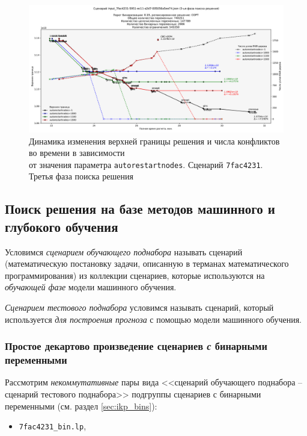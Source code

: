 \documentclass[%
	11pt,
	a4paper,
	utf8,
		]{article}
\begin{document}
{%
\begin{figure}[!h]
	\centering
	\includegraphics[scale=0.42]{figures/7fac4231_autorestartnodes.pdf}
	\caption{ Динамика изменения верхней границы решения и числа конфликтов во времени в зависимости \\от значения параметра \texttt{autorestartnodes}. Сценарий \texttt{7fac4231}. Третья фаза поиска решения}\label{fig:7fac4231_autorestartnodes}
\end{figure}

\subsection{Поиск решения на базе методов машинного и глубокого обучения}

Условимся \emph{сценарием обучающего поднабора} называть сценарий (математическую постановку задачи, описанную в терманах математического программирования) из коллекции сценариев, которые используются на \emph{обучающей фазе} модели машинного обучения.

\emph{Сценарием тестового поднабора} условимся называть сценарий, который используется \emph{для построения прогноза} с помощью модели машинного обучения.

\subsubsection{Простое декартово произведение сценариев \emph{с} бинарными переменными}

 Рассмотрим \emph{некоммутативные} пары вида <<сценарий обучающего поднабора -- сценарий тестового поднабора>> подгруппы сценариев с бинарными переменными (см. раздел \ref{sec:ikp_bins}):
\begin{itemize}
	\item \texttt{7fac4231\_bin.lp},
	

\end{itemize}}
\end{document}
